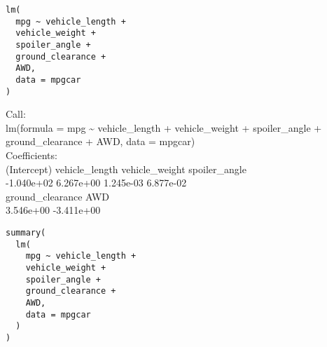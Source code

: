 \documentclass[11pt]{article}
\begin{document}
\begin{verbatim}
lm(
  mpg ~ vehicle_length +
  vehicle_weight +
  spoiler_angle +
  ground_clearance +
  AWD,
  data = mpgcar
)
\end{verbatim}

\begin{org}


Call:\\
lm(formula = mpg \textasciitilde{} vehicle\_length + vehicle\_weight + spoiler\_angle +\\
    ground\_clearance + AWD, data = mpgcar)\\

Coefficients:\\
     (Intercept)    vehicle\_length    vehicle\_weight     spoiler\_angle\\
      -1.040e+02         6.267e+00         1.245e-03         6.877e-02\\
ground\_clearance               AWD\\
       3.546e+00        -3.411e+00\\
\end{org}

\begin{verbatim}
summary(
  lm(
    mpg ~ vehicle_length +
    vehicle_weight +
    spoiler_angle +
    ground_clearance +
    AWD,
    data = mpgcar
  )
)
\end{verbatim}
\end{document}
